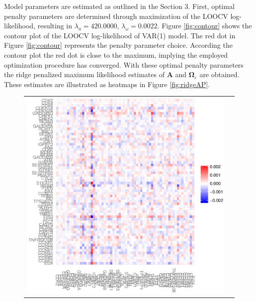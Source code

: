 \documentclass[a4paper]{article}
\begin{document}
Model parameters are estimated as outlined in the Section 3. First, optimal penalty parameters are determined through maximization of the LOOCV log-likelihood, resulting in $\lambda_a=420.0000$, $\lambda_{\omega}= 0.0022$. Figure \ref{fig:contour} shows the contour plot of the LOOCV log-likelihood of VAR(1) model. The red dot in Figure \ref{fig:contour} represents the penalty parameter choice. According the contour plot the red dot is close to the maximum, implying the employed optimization procedure has converged. With these optimal penalty parameters the ridge penalized maximum likelihood estimates of $\mathbf{A}$ and $\mathbf{\Omega}_{\varepsilon}$ are obtained. These estimates are illustrated as heatmaps in Figure \ref{fig:ridgeAP}. 

\begin{figure}[h!]
\centering
\begin{tabular}{cc}
\includegraphics[scale=0.33]{ridgeA.eps}&

\end{tabular}
\end{figure}
\end{document}
